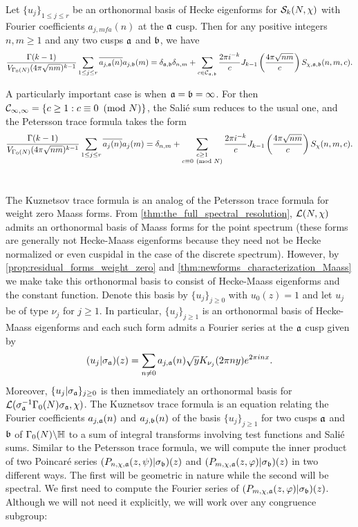     \begin{theorem}
      Let $\{u_{j}\}_{1 \le j \le r}$ be an orthonormal basis of Hecke eigenforms for $\mathcal{S}_{k}(N,\chi)$ with Fourier coefficients $a_{j,
      mf{a}}(n)$ at the $\mathfrak{a}$ cusp. Then for any positive integers $n,m \ge 1$ and any two cusps $\mathfrak{a}$ and $\mathfrak{b}$, we have
      \[
        \frac{\Gamma(k-1)}{V_{\Gamma_{0}(N)}(4\pi \sqrt{nm})^{k-1}}\sum_{1 \le j \le r}\overline{a_{j,\mathfrak{a}}(n)}a_{j,\mathfrak{b}}(m) = \delta_{\mathfrak{a},\mathfrak{b}}\delta_{n,m}+\sum_{c \in \mathcal{C}_{\mathfrak{a},\mathfrak{b}}}\frac{2\pi i^{-k}}{c}J_{k-1}\left(\frac{4\pi\sqrt{nm}}{c}\right)S_{\chi,\mathfrak{a},\mathfrak{b}}(n,m,c).
      \]
    \end{theorem}

    A particularly important case is when $\mathfrak{a} = \mathfrak{b} = \infty$. For then $\mathcal{C}_{\infty,\infty} = \{c \ge 1:c \equiv 0 \ \left(\text{mod }N\right)\}$, the Sali\'e sum reduces to the usual one, and the Petersson trace formula takes the form
    \[
      \frac{\Gamma(k-1)}{V_{\Gamma_{0}(N)}(4\pi \sqrt{nm})^{k-1}}\sum_{1 \le j \le r}\overline{a_{j}(n)}a_{j}(m) = \delta_{n,m}+\sum_{\substack{c \ge 1 \\ c \equiv 0 \ \left(\text{mod }N\right)}}\frac{2\pi i^{-k}}{c}J_{k-1}\left(\frac{4\pi\sqrt{nm}}{c}\right)S_{\chi}(n,m,c).
    \]
  \section{}
    The Kuznetsov trace formula is an analog of the Petersson trace formula for weight zero Maass forms. From \cref{thm:the_full_spectral_resolution}, $\mathcal{L}(N,\chi)$ admits an orthonormal basis of Maass forms for the point spectrum (these forms are generally not Hecke-Maass eigenforms because they need not be Hecke normalized or even cuspidal in the case of the discrete spectrum). However, by \cref{prop:residual_forms_weight_zero} and \cref{thm:newforms_characterization_Maass} we make take this orthonormal basis to consist of Hecke-Maass eigenforms and the constant function. Denote this basis by $\{u_{j}\}_{j \ge 0}$ with $u_{0}(z) = 1$ and let $u_{j}$ be of type $\nu_{j}$ for $j \ge 1$. In particular, $\{u_{j}\}_{j \ge 1}$ is an orthonormal basis of Hecke-Maass eigenforms and each such form admits a Fourier series at the $\mathfrak{a}$ cusp given by
    \[
      (u_{j}|\sigma_{\mathfrak{a}})(z) = \sum_{n \neq 0}a_{j,\mathfrak{a}}(n)\sqrt{y}K_{\nu_{j}}(2\pi ny)e^{2\pi inx}.
    \]
    Moreover, $\{u_{j}|\sigma_{\mathfrak{a}}\}_{j \ge 0}$ is then immediately an orthonormal basis for $\mathcal{L}(\sigma_{\mathfrak{a}}^{-1}\Gamma_{0}(N)\sigma_{\mathfrak{a}},\chi)$. The Kuznetsov trace formula is an equation relating the Fourier coefficients $a_{j,\mathfrak{a}}(n)$ and $a_{j,\mathfrak{b}}(n)$ of the basis $\{u_{j}\}_{j \ge 1}$ for two cusps $\mathfrak{a}$ and $\mathfrak{b}$ of $\Gamma_{0}(N)\backslash\mathbb{H}$ to a sum of integral transforms involving test functions and Sali\'e sums. Similar to the Petersson trace formula, we will compute the inner product of two Poincar\'e series $(P_{n,\chi,\mathfrak{a}}(z,\psi)|\sigma_{\mathfrak{b}})(z)$ and $(P_{m,\chi,\mathfrak{a}}(z,\varphi)|\sigma_{\mathfrak{b}})(z)$ in two different ways. The first will be geometric in nature while the second will be spectral. We first need to compute the Fourier series of $(P_{m,\chi,\mathfrak{a}}(z,\varphi)|\sigma_{\mathfrak{b}})(z)$. Although we will not need it explicitly, we will work over any congruence subgroup:


